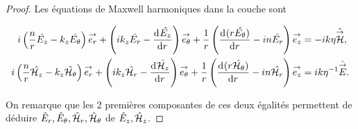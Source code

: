   \begin{proof}

    Les équations de Maxwell harmoniques dans la couche sont

    \begin{equation*}
    \begin{aligned}
      i\left(\frac{n}{r}\hat{E_z} - k_z\hat{E_\theta}\right)\vect{e_r} +
      \left(ik_z\hat{E_r} - \ddp{r}{\hat{E_z}}\right)\vect{e_\theta} +
      \frac{1}{r}\left(\ddp{r}{(r\hat{E_\theta})}-in\hat{E_r}\right)\vect{e_z}
      &=-ik \eta \hat \vH,
      \\
      i\left(\frac{n}{r}\hat{\cH_z} - k_z\hat{\cH_\theta}\right)\vect{e_r} +
      \left(ik_z\hat{\cH_r} - \ddp{r}{\hat{\cH_z}}\right)\vect{e_\theta} +
      \frac{1}{r}\left(\ddp{r}{(r\hat{\cH_\theta})}-in\hat{\cH_r}\right)\vect{e_z}
      &=i k\eta^{-1} \hat \vE.
    \end{aligned}
    \end{equation*}

    On remarque que les 2 premières composantes de ces deux égalités permettent de déduire \(\hat E_r,\hat E_\theta, \hat \cH_r,\hat \cH_\theta\) de \(\hat E_z,\hat \cH_z\).


\end{proof}
